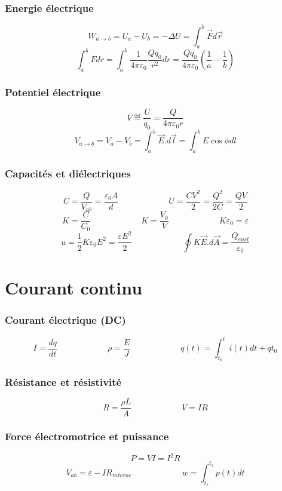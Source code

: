 \section{Energie électrique}
\[ W_{a\rightarrow b} = U_a - U_b = -\Delta{U} = \int_{a}^{b}\vec{F} d\vec{r} \]
\[ \int_{a}^{b}F dr = \int_{a}^{b}\frac{1}{4\pi\varepsilon_0}\frac{Qq_0}{r^2} dr = \frac{Qq_0}{4\pi\varepsilon_0}\left(\frac{1}{a} - \frac{1}{b}\right) \]

\section{Potentiel électrique}
\[ V \eqdef \frac{U}{q_0} = \frac{Q}{4\pi\varepsilon_0{r}} \]
\[ V_{a \rightarrow b} = V_a - V_b = \int_{a}^{b}\vec{E}.d\vec{l} = \int_{a}^{b}E\cos{\phi} dl \]

\section{Capacités et diélectriques}
\[ C = \frac{Q}{V_{ab}} = \frac{\varepsilon_0A}{d}\qquad{\qquad{\qquad}} U = \frac{CV^2}{2} = \frac{Q^2}{2C} = \frac{QV}{2} \]
\[ K = \frac{C}{C_0}  \qquad{\qquad{\qquad}}   K = \frac{V_0}{V}  \qquad{\qquad{\qquad}}    K\varepsilon_0 = \varepsilon \]
\[ u = \frac{1}{2}K\varepsilon_0E^2 = \frac{\varepsilon{E^2}}{2} \qquad{\qquad{\qquad}} \oint{K}\vec{E}.d\vec{A} = \frac{Q_{encl}}{\varepsilon_0} \]

\part{Courant continu}
\section{Courant électrique (DC)}
\[I = \frac{dq}{dt}\qquad{\qquad{\qquad}}\rho = \frac{E}{J}\qquad{\qquad{\qquad}}q(t) = \int_{t_0}^{t}i(t) dt + q{t_0}\]

\section{Résistance et résistivité}
\[R = \frac{\rho{L}}{A} \qquad{\qquad{\qquad}}V = IR\]

\section{Force électromotrice et puissance}
\[P = VI = I^2R\] 
\[ V_{ab} = \varepsilon - IR_{interne}\qquad{\qquad{\qquad}}w = \int_{t_1}^{t_2}p(t) dt\]

